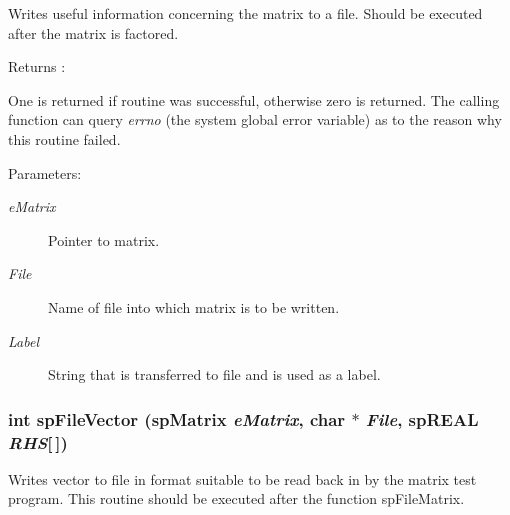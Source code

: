 Writes useful information concerning the matrix to a file. Should be executed after the matrix is factored.

\begin{Desc}
\item[Returns :]\par
 One is returned if routine was successful, otherwise zero is returned. The calling function can query {\em errno} (the system global error variable) as to the reason why this routine failed.\end{Desc}
\begin{Desc}
\item[Parameters: ]\par
\begin{description}
\item[{\em 
e\-Matrix}]Pointer to matrix. \item[{\em 
File}]Name of file into which matrix is to be written. \item[{\em 
Label}]String that is transferred to file and is used as a label. \end{description}
\end{Desc}
\subsubsection{\setlength{\rightskip}{0pt plus 5cm}int sp\-File\-Vector ({\bf sp\-Matrix} {\em e\-Matrix}, char $\ast$ {\em File}, sp\-REAL {\em RHS}[$\,$])}\label{spOutput_8c_a5}


Writes vector to file in format suitable to be read back in by the matrix test program. This routine should be executed after the function sp\-File\-Matrix.

